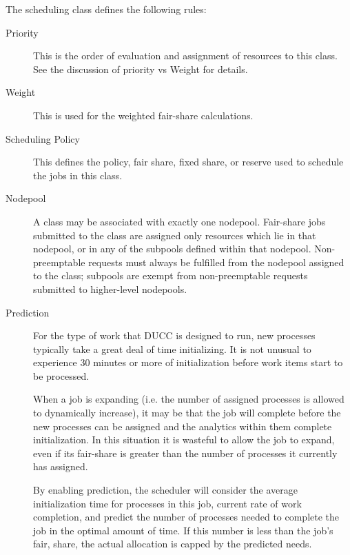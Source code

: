     The scheduling class defines the following rules: 
    
    \begin{description}
        \item[Priority] This is the order of evaluation and assignment of resources to this class. See
          the discussion of priority vs Weight for details. 

        \item[Weight] This is used for the weighted fair-share calculations. 

        \item[Scheduling Policy] This defines the policy, fair share, fixed share, or reserve used to
          schedule the jobs in this class.

        \item[Nodepool] A class may be associated with exactly one nodepool. Fair-share jobs submitted to the class
          are assigned only resources which lie in that nodepool, or in any of the subpools defined
          within that nodepool.  Non-preemptable requests must always be fulfilled from the nodepool
          assigned to the class; subpools are exempt from non-preemptable requests submitted to higher-level
          nodepools.

        \item[Prediction] For the type of work that DUCC is designed to run, new processes typically take
          a great deal of time initializing. It is not unusual to experience 30 minutes or more of
          initialization before work items start to be processed.

          When a job is expanding (i.e. the number of assigned processes is allowed to dynamically 
          increase), it may be that the job will complete before the new processes can be assigned and 
          the analytics within them complete initialization. In this situation it is wasteful to allow the 
          job to expand, even if its fair-share is greater than the number of processes it currently has 
          assigned. 
          
          By enabling prediction, the scheduler will consider the average initialization time for processes 
          in this job, current rate of work completion, and predict the number of processes needed to 
          complete the job in the optimal amount of time. If this number is less than the job's fair, share, 
          the actual allocation is capped by the predicted needs. 
          

\end{description}

